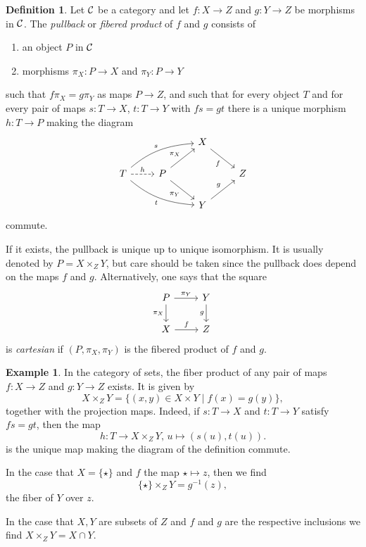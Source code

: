 \documentclass[11pt]{amsbook}
\theoremstyle{plain}
\theoremstyle{definition}
\newtheorem{definition}[theorem]{Definition}
\newtheorem{example}[theorem]{Example}
\begin{document}
\begin{definition}
Let ${\mathcal{C}}$ be a category and let  $f\colon X\to Z$ and $g\colon Y\to Z$ be morphisms in ${\mathcal{C}}$. The \emph{pullback} or \emph{fibered product} of $f$ and $g$ consists of 
\begin{enumerate}
\item an object $P$ in ${\mathcal{C}}$
\item morphisms $\pi_X\colon P \to X$ and $\pi_Y\colon P \to Y$
\end{enumerate}
such that $f\pi_X=g\pi_Y$ as maps $P\to Z$, and such that for every object $T$ and for every pair of maps $s\colon T\to X$, $t\colon T\to Y$ with $fs=gt$
there is a unique morphism $h\colon T\to P$ making the diagram
\[
\begin{tikzcd}
& & X \arrow[swap]{rd}{f} \\
T \arrow[out=40,in=185]{rru}{s} \arrow[out=-40,in=175,swap]{rrd}{t} \arrow[dashed]{r}{h}
	& P \arrow{ru}{\pi_X} \arrow[swap]{rd}{\pi_Y} & & Z  \\
& & Y \arrow{ru}{g}
\end{tikzcd}
\]
commute.
\end{definition}

 If it exists, the pullback is unique up to unique isomorphism. It is usually denoted by $P=X\times_Z Y$, but care should be taken since the pullback does depend on the maps $f$ and $g$. Alternatively, one  says that the square
 \[
 \begin{tikzcd}
 	P \arrow{r}{\pi_Y} \arrow[swap]{d}{\pi_X} & Y \arrow[swap]{d}{g} \\
	X \arrow{r}{f} & Z
\end{tikzcd}
\]
is \emph{cartesian} if $(P,\pi_X,\pi_Y)$ is the fibered product of $f$ and $g$.
 
\begin{example}
In the category of sets, the fiber product of any pair of maps $f\colon X\to Z$ and $g\colon Y\to Z$ exists. It is given by
\[
	X\times_Z Y = \{ (x,y) \in X\times Y \mid f(x) = g(y) \},
\]
together with the projection maps. Indeed, if $s\colon T\to X$ and $t\colon T\to Y$ satisfy $fs=gt$, then the  map
\[
	h\colon T \to X\times_Z Y,\, u \mapsto (s(u),t(u)).
\]
is the unique map making the diagram of the definition commute. 

In the  case that $X=\{\star\}$ and $f$ the map $\star \mapsto z$, then we find
\[
	\{\star\} \times_Z Y = g^{-1}(z),
\]
the fiber of $Y$ over $z$.

In the case that $X, Y$ are subsets of  $Z$ and $f$ and $g$ are the respective inclusions we find
$X\times_Z Y = X \cap Y$.
\end{example}
\end{document}
